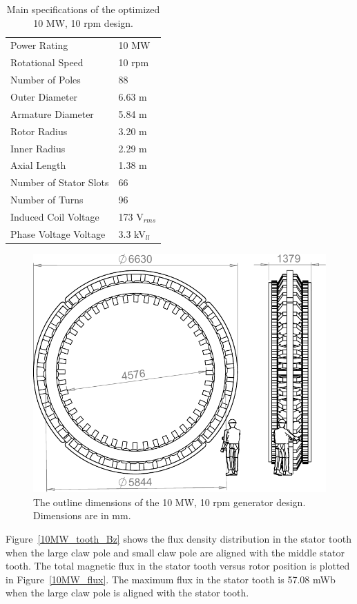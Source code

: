 \documentclass[12pt]{iopart}
\begin{document}
\begin{table}[]
  \centering
  \begin{tabular}{ll}
\hline
Power Rating & 10 MW \\
Rotational Speed & 10 rpm \\
Number of Poles & 88 \\
\hline
Outer Diameter & 6.63 m \\
Armature Diameter & 5.84 m \\
Rotor Radius & 3.20 m \\
Inner Radius & 2.29 m \\
Axial Length & 1.38 m \\
\hline
Number of Stator Slots & 66 \\
Number of Turns & 96 \\
Induced Coil Voltage & 173 V$_{rms}$\\
Phase Voltage Voltage & 3.3 kV$_{ll}$ \\
\hline
 \end{tabular}
  \caption{Main specifications of the optimized 10 MW, 10 rpm design.}
  \label{10MW_spec}
\end{table}

\begin{figure}[]
  \centering
    \includegraphics[]{10MW_outline_drawing}
  \caption{The outline dimensions of the 10 MW, 10 rpm generator design. Dimensions are in mm.}
  \label{10MW_drawing}
\end{figure}

Figure~\ref{10MW_tooth_Bz} shows the flux density distribution in the stator tooth when the large claw pole and small claw pole are aligned with the middle stator tooth.
The total magnetic flux in the stator tooth versus rotor position is plotted in Figure~\ref{10MW_flux}.
The maximum flux in the stator tooth is 57.08 mWb when the large claw pole is aligned with the stator tooth. 
\end{document}
